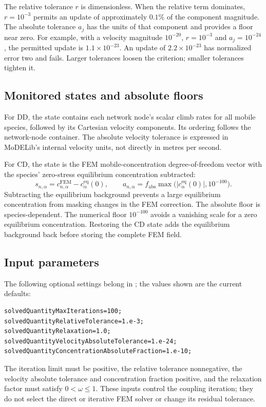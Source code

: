 The relative tolerance $r$ is dimensionless. When the relative term dominates, $r=10^{-3}$ permits an update of approximately $0.1\%$ of the component magnitude. The absolute tolerance $a_j$ has the units of that component and provides a floor near zero. For example, with a velocity magnitude $10^{-20}$, $r=10^{-3}$ and $a_j=10^{-24}$, the permitted update is $1.1\times10^{-23}$. An update of $2.2\times10^{-23}$ has normalized error two and fails. Larger tolerances loosen the criterion; smaller tolerances tighten it.

\subsection{Monitored states and absolute floors}
For DD, the state contains each network node's scalar climb rates for all mobile species, followed by its Cartesian velocity components. Its ordering follows the network-node container. The absolute velocity tolerance is expressed in MoDELib's internal velocity units, not directly in metres per second.

For CD, the state is the FEM mobile-concentration degree-of-freedom vector with the species' zero-stress equilibrium concentration subtracted:
\begin{equation}
 s_{n,\alpha}=c^{\mathrm{FEM}}_{n,\alpha}-c^{\mathrm{eq}}_\alpha(0),\qquad
 a_{n,\alpha}=f_{\mathrm{abs}}\max\bigl(|c^{\mathrm{eq}}_\alpha(0)|,10^{-100}\bigr).
\end{equation}
Subtracting the equilibrium background prevents a large equilibrium concentration from masking changes in the FEM correction. The absolute floor is species-dependent. The numerical floor $10^{-100}$ avoids a vanishing scale for a zero equilibrium concentration. Restoring the CD state adds the equilibrium background back before storing the complete FEM field.

\subsection{Input parameters}
The following optional settings belong in ; the values shown are the current defaults:
\begin{lstlisting}
solvedQuantityMaxIterations=100;
solvedQuantityRelativeTolerance=1.e-3;
solvedQuantityRelaxation=1.0;
solvedQuantityVelocityAbsoluteTolerance=1.e-24;
solvedQuantityConcentrationAbsoluteFraction=1.e-10;
\end{lstlisting}
The iteration limit must be positive, the relative tolerance nonnegative, the velocity absolute tolerance and concentration fraction positive, and the relaxation factor must satisfy $0<\omega\leq1$. These inputs control the coupling iteration; they do not select the direct or iterative FEM solver or change its residual tolerance.

